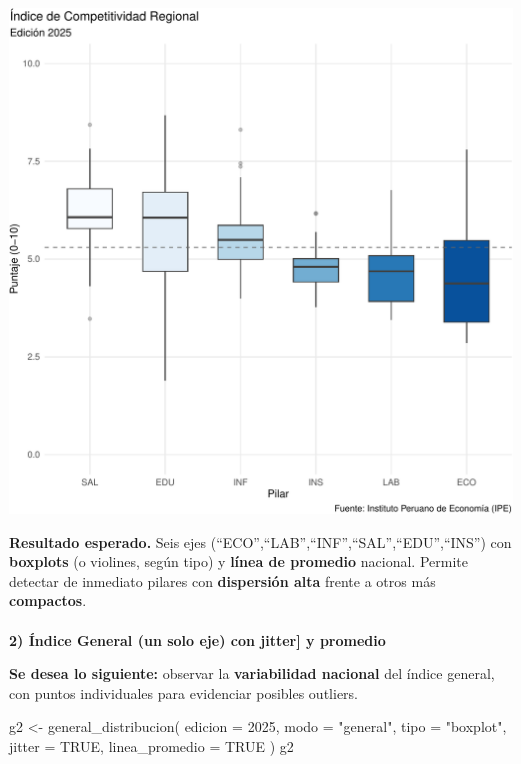 \documentclass[
  11pt,
  letterpaper,
  DIV=11,
  numbers=noendperiod]{scrartcl}
\makeatletter
\let\oldparagraph\paragraph
\renewcommand{\paragraph}{
    \@ifstar
      \xxxParagraphStar
      \xxxParagraphNoStar
  }
\newcommand{\xxxParagraphStar}[1]{\oldparagraph*{#1}\mbox{}}
\newcommand{\xxxParagraphNoStar}[1]{\oldparagraph{#1}\mbox{}}
\newenvironment{Shaded}{\begin{snugshade}}{\end{snugshade}}
\newcommand{\AttributeTok}[1]{\textcolor[rgb]{0.40,0.45,0.13}{#1}}
\newcommand{\ConstantTok}[1]{\textcolor[rgb]{0.56,0.35,0.01}{#1}}
\newcommand{\DecValTok}[1]{\textcolor[rgb]{0.68,0.00,0.00}{#1}}
\newcommand{\FunctionTok}[1]{\textcolor[rgb]{0.28,0.35,0.67}{#1}}
\newcommand{\NormalTok}[1]{\textcolor[rgb]{0.00,0.23,0.31}{#1}}
\newcommand{\OtherTok}[1]{\textcolor[rgb]{0.00,0.23,0.31}{#1}}
\newcommand{\StringTok}[1]{\textcolor[rgb]{0.13,0.47,0.30}{#1}}
\makeatother
\begin{document}
\includegraphics{Manual_files/figure-pdf/unnamed-chunk-26-1.pdf}

\textbf{Resultado esperado.} Seis ejes
(``ECO'',``LAB'',``INF'',``SAL'',``EDU'',``INS'') con \textbf{boxplots}
(o violines, según tipo) y \textbf{línea de promedio} nacional. Permite
detectar de inmediato pilares con \textbf{dispersión alta} frente a
otros más \textbf{compactos}.

\paragraph{\texorpdfstring{\textbf{2) Índice General (un solo eje) con
jitter{]} y
promedio}}{2) Índice General (un solo eje) con jitter{]} y promedio}}\label{uxedndice-general-un-solo-eje-con-jitter-y-promedio}

\textbf{Se desea lo siguiente:} observar la \textbf{variabilidad
nacional} del índice general, con puntos individuales para evidenciar
posibles outliers.

\begin{Shaded}
\begin{Highlighting}[]
\NormalTok{g2 }\OtherTok{\textless{}{-}} \FunctionTok{general\_distribucion}\NormalTok{(}
  \AttributeTok{edicion =} \DecValTok{2025}\NormalTok{,}
  \AttributeTok{modo    =} \StringTok{"general"}\NormalTok{,}
  \AttributeTok{tipo    =} \StringTok{"boxplot"}\NormalTok{,}
  \AttributeTok{jitter  =} \ConstantTok{TRUE}\NormalTok{,}
  \AttributeTok{linea\_promedio =} \ConstantTok{TRUE}
\NormalTok{)}
\NormalTok{g2}
\end{Highlighting}
\end{Shaded}
\end{document}
